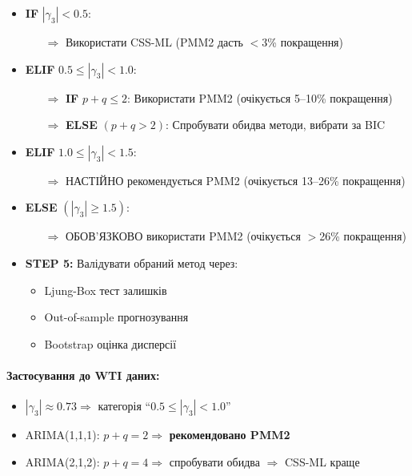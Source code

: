 \documentclass[12pt,a4paper]{article}
\begin{document}
\begin{itemize}
    \item \textbf{IF} $|\gamma_3| < 0.5$:
    \begin{itemize}
        \item[$\Rightarrow$] Використати CSS-ML (PMM2 дасть $<$3\% покращення)
    \end{itemize}

    \item \textbf{ELIF} $0.5 \leq |\gamma_3| < 1.0$:
    \begin{itemize}
        \item[$\Rightarrow$] \textbf{IF} $p+q \leq 2$: Використати PMM2 (очікується 5--10\% покращення)
        \item[$\Rightarrow$] \textbf{ELSE} $(p+q > 2)$: Спробувати обидва методи, вибрати за BIC
    \end{itemize}

    \item \textbf{ELIF} $1.0 \leq |\gamma_3| < 1.5$:
    \begin{itemize}
        \item[$\Rightarrow$] НАСТІЙНО рекомендується PMM2 (очікується 13--26\% покращення)
    \end{itemize}

    \item \textbf{ELSE} $(|\gamma_3| \geq 1.5)$:
    \begin{itemize}
        \item[$\Rightarrow$] ОБОВ'ЯЗКОВО використати PMM2 (очікується $>$26\% покращення)
    \end{itemize}

    \item \textbf{STEP 5:} Валідувати обраний метод через:
    \begin{itemize}
        \item Ljung-Box тест залишків
        \item Out-of-sample прогнозування
        \item Bootstrap оцінка дисперсії
    \end{itemize}
\end{itemize}

\paragraph{Застосування до WTI даних:}
\begin{itemize}
    \item $|\gamma_3| \approx 0.73 \Rightarrow$ категорія ``$0.5 \leq |\gamma_3| < 1.0$''
    \item ARIMA(1,1,1): $p+q = 2 \Rightarrow$ \textbf{рекомендовано PMM2} \checkmark
    \item ARIMA(2,1,2): $p+q = 4 \Rightarrow$ спробувати обидва $\Rightarrow$ CSS-ML краще \checkmark
\end{itemize}
\end{document}
